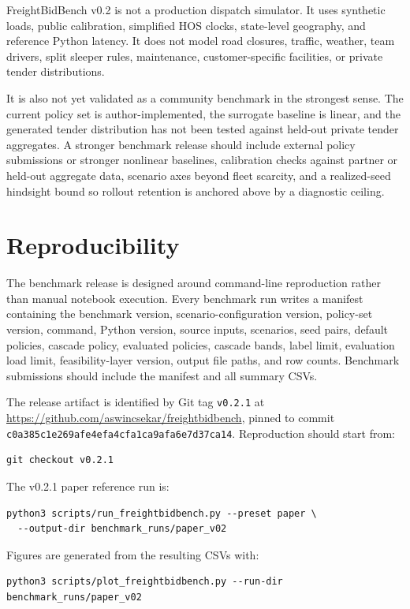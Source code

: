 \documentclass[11pt]{article}
\begin{document}
FreightBidBench v0.2 is not a production dispatch simulator. It uses synthetic
loads, public calibration, simplified HOS clocks, state-level geography, and
reference Python latency. It does not model road closures, traffic, weather,
team drivers, split sleeper rules, maintenance, customer-specific facilities,
or private tender distributions.

It is also not yet validated as a community benchmark in the strongest sense.
The current policy set is author-implemented, the surrogate baseline is linear,
and the generated tender distribution has not been tested against held-out
private tender aggregates. A stronger benchmark release should include
external policy submissions or stronger nonlinear baselines, calibration checks
against partner or held-out aggregate data, scenario axes beyond fleet
scarcity, and a realized-seed hindsight bound so rollout retention is anchored
above by a diagnostic ceiling.

\section{Reproducibility}

The benchmark release is designed around command-line reproduction rather than
manual notebook execution. Every benchmark run writes a manifest containing the
benchmark version, scenario-configuration version, policy-set version, command,
Python version, source inputs, scenarios, seed pairs, default policies, cascade
policy, evaluated policies, cascade bands, label limit, evaluation load limit,
feasibility-layer version, output file paths, and row counts. Benchmark
submissions should include the manifest and all summary CSVs.

The release artifact is identified by Git tag \texttt{v0.2.1} at
\url{https://github.com/aswincsekar/freightbidbench}, pinned to commit
\texttt{c0a385c1e269afe4efa4cfa1ca9afa6e7d37ca14}. Reproduction should start
from:
\begin{verbatim}
git checkout v0.2.1
\end{verbatim}

The v0.2.1 paper reference run is:
\begin{verbatim}
python3 scripts/run_freightbidbench.py --preset paper \
  --output-dir benchmark_runs/paper_v02
\end{verbatim}

Figures are generated from the resulting CSVs with:
\begin{verbatim}
python3 scripts/plot_freightbidbench.py --run-dir benchmark_runs/paper_v02
\end{verbatim}
\end{document}
